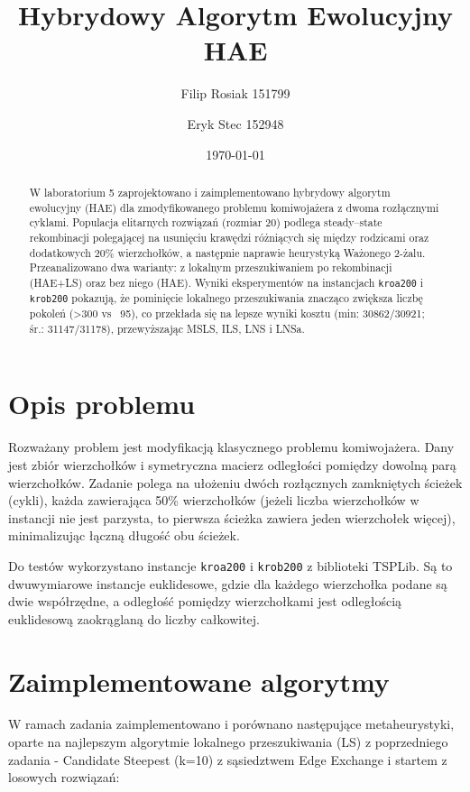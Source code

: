 \documentclass[12pt,a4paper]{article}
\title{Hybrydowy Algorytm Ewolucyjny HAE}
\author{Filip Rosiak 151799  \and Eryk Stec 152948}
\date{\today}
\begin{document}
\maketitle

\begin{abstract}
W laboratorium 5 zaprojektowano i zaimplementowano hybrydowy algorytm ewolucyjny (HAE) dla zmodyfikowanego problemu komiwojażera z dwoma rozłącznymi cyklami. Populacja elitarnych rozwiązań (rozmiar 20) podlega steady–state rekombinacji polegającej na usunięciu krawędzi różniących się między rodzicami oraz dodatkowych 20\% wierzchołków, a następnie naprawie heurystyką Ważonego 2-żalu. Przeanalizowano dwa warianty: z lokalnym przeszukiwaniem po rekombinacji (HAE+LS) oraz bez niego (HAE). Wyniki eksperymentów na instancjach \texttt{kroa200} i \texttt{krob200} pokazują, że pominięcie lokalnego przeszukiwania znacząco zwiększa liczbę pokoleń (>300 vs ~95), co przekłada się na lepsze wyniki kosztu (min: 30862/30921; śr.: 31147/31178), przewyższając MSLS, ILS, LNS i LNSa.
\end{abstract}

\section{Opis problemu}
Rozważany problem jest modyfikacją klasycznego problemu komiwojażera. Dany jest zbiór wierzchołków i symetryczna macierz odległości pomiędzy dowolną parą wierzchołków. Zadanie polega na ułożeniu dwóch rozłącznych zamkniętych ścieżek (cykli), każda zawierająca 50\% wierzchołków (jeżeli liczba wierzchołków w instancji nie jest parzysta, to pierwsza ścieżka zawiera jeden wierzchołek więcej), minimalizując łączną długość obu ścieżek.

Do testów wykorzystano instancje \texttt{kroa200} i \texttt{krob200} z biblioteki TSPLib. Są to dwuwymiarowe instancje euklidesowe, gdzie dla każdego wierzchołka podane są dwie współrzędne, a odległość pomiędzy wierzchołkami jest odległością euklidesową zaokrąglaną do liczby całkowitej.

\section{Zaimplementowane algorytmy}
W ramach zadania zaimplementowano i porównano następujące metaheurystyki, oparte na najlepszym algorytmie lokalnego przeszukiwania (LS) z poprzedniego zadania - Candidate Steepest (k=10) z sąsiedztwem Edge Exchange i startem z losowych rozwiązań:
\end{document}
